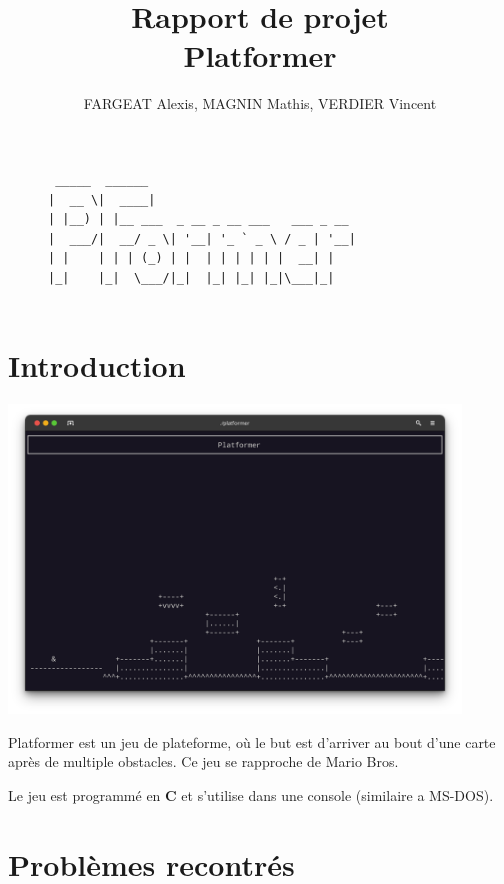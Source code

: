 \documentclass[12pt]{article}
\title{Rapport de projet\\ Platformer}
\author{\small FARGEAT Alexis, MAGNIN Mathis, VERDIER Vincent}
\begin{document}
	\maketitle

	\begin{figure}[H]
		\centering
		\begin{BVerbatim}
 _____  ______                               
|  __ \|  ____|                             
| |__) | |__ ___  _ __ _ __ ___   ___ _ __   
|  ___/|  __/ _ \| '__| '_ ` _ \ / _ | '__|
| |    | | | (_) | |  | | | | | |  __| |     
|_|    |_|  \___/|_|  |_| |_| |_|\___|_|   


		\end{BVerbatim}
	\end{figure}

	\tableofcontents
	\newpage

	\section{Introduction}
	
		\begin{center}
			\includegraphics[width=0.90\textwidth]{content/image.png}
		\end{center}
	
		Platformer est un jeu de plateforme, où le but est d'arriver au bout d'une carte après de multiple obstacles.
		Ce jeu se rapproche de Mario Bros.
	
		Le jeu est programmé en \textbf{C} et s'utilise dans une console (similaire a MS-DOS).
	

	\section{Problèmes recontrés}
\end{document}
